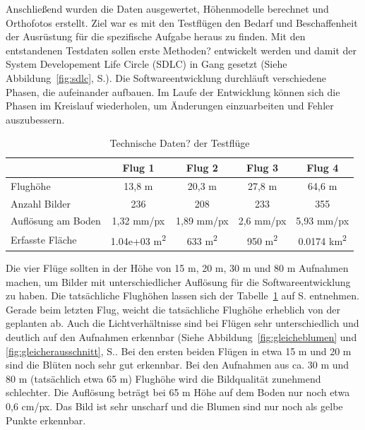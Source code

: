 Anschließend wurden die Daten ausgewertet, Höhenmodelle berechnet und Orthofotos erstellt. Ziel war es mit den Testflügen den Bedarf und Beschaffenheit der Ausrüstung für die spezifische Aufgabe heraus zu finden. Mit den entstandenen Testdaten sollen erste Methoden? entwickelt werden und damit der System Developement Life Circle (SDLC) in Gang gesetzt (Siehe Abbildung~\ref{fig:sdlc}, S.\pageref{fig:sdlc}). Die Softwareentwicklung durchläuft verschiedene Phasen, die aufeinander aufbauen. Im Laufe der Entwicklung können sich die Phasen im Kreislauf wiederholen, um Änderungen einzuarbeiten und Fehler auszubessern. 




\begin{table}[hbt]
\selectfont
\begin{tabular}{lcccc} %
\textbf{} & \textbf{Flug 1} & \textbf{Flug 2}  & \textbf{Flug 3} & \textbf{Flug 4} \\ %
\hline\hline
Flughöhe & 13,8 m & 20,3 m & 27,8 m & 64,6 m \\
Anzahl Bilder & 236 & 208 & 233 & 355 \\
Auflösung am Boden & 1,32 mm/px & 1,89 mm/px & 2,6 mm/px & 5,93 mm/px \\
Erfasste Fläche & 1.04e+03 m\textsuperscript{2} & 633 m\textsuperscript{2} & 950 m\textsuperscript{2} & 0.0174 km\textsuperscript{2} \\
\hline
\end{tabular}
\caption{Technische Daten? der Testflüge}
\label{tab:flugvergleich}
\end{table}

Die vier Flüge sollten in der Höhe von 15 m, 20 m, 30 m und 80 m Aufnahmen machen, um Bilder mit unterschiedlicher Auflösung für die Softwareentwicklung zu haben. Die tatsächliche Flughöhen lassen sich der Tabelle~\ref{tab:flugvergleich} auf S.\pageref{tab:flugvergleich} entnehmen. Gerade beim letzten Flug, weicht die tatsächliche Flughöhe erheblich von der geplanten ab. Auch die Lichtverhältnisse sind bei Flügen sehr unterschiedlich und deutlich auf den Aufnahmen erkennbar (Siehe Abbildung~\ref{fig:gleicheblumen} und \ref{fig:gleicherausschnitt}, S.\pageref{fig:gleicheblumen}. Bei den ersten beiden Flügen in etwa 15 m und 20 m sind die Blüten noch sehr gut erkennbar. Bei den Aufnahmen aus ca. 30 m und 80 m (tatsächlich etwa 65 m) Flughöhe wird die Bildqualität zunehmend schlechter. Die Auflösung beträgt bei 65 m Höhe auf dem Boden nur noch etwa 0,6 cm/px. Das Bild ist sehr unscharf und die Blumen sind nur noch als gelbe Punkte erkennbar. 

